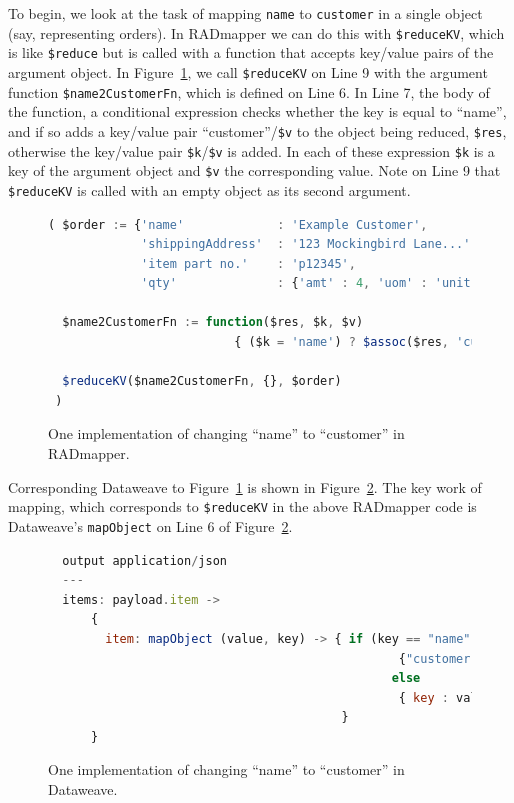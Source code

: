 \documentclass[10pt,letterpaper]{article} %
\newcommand{\stt}[1]{\texttt{#1}} %
\begin{document}
To begin, we look at the task of mapping \stt{name} to \stt{customer} in a single object (say, representing orders).
In RADmapper we can do this with \stt{\$reduceKV}, which is like \stt{\$reduce} but is called with a function that accepts key/value pairs of the argument object.
In Figure~\ref{code:reduceKV}, we call \stt{\$reduceKV} on Line 9 with the argument function \stt{\$name2CustomerFn}, which is defined on Line 6.
In Line 7, the body of the function, a conditional expression checks whether the key is equal to ``name'', and if so adds a key/value pair ``customer''/\stt{\$v} to the object being reduced, \stt{\$res},
otherwise the key/value pair \stt{\$k}/\stt{\$v} is added.
In each of these expression \stt{\$k} is a key of the argument object and \stt{\$v} the corresponding value.
Note on Line 9 that \stt{\$reduceKV} is called with an empty object as its second argument.

\begin{figure}[H]
  \caption{One implementation of changing ``name'' to ``customer'' in RADmapper.}
 \label{code:reduceKV}
\begin{lstlisting}[language=JavaScript,basicstyle=\ttfamily\scriptsize,numberstyle=\scriptsize]
( $order := {'name'             : 'Example Customer',
             'shippingAddress'  : '123 Mockingbird Lane...',
             'item part no.'    : 'p12345',
             'qty'              : {'amt' : 4, 'uom' : 'unit'}};

  $name2CustomerFn := function($res, $k, $v)
                          { ($k = 'name') ? $assoc($res, 'customer', $v) : $assoc($res, $k, $v) };

  $reduceKV($name2CustomerFn, {}, $order)
 )
\end{lstlisting}
\end{figure}  \vspace{-2em}

Corresponding Dataweave to Figure~\ref{code:reduceKV} is shown in Figure~\ref{code:dataweave-1}.
The key work of mapping, which corresponds to \stt{\$reduceKV} in the above RADmapper code is Dataweave's \stt{mapObject} on Line 6 of Figure~\ref{code:dataweave-1}.

 \begin{figure}[H]
  \caption{One implementation of changing ``name'' to ``customer'' in Dataweave.}
 \label{code:dataweave-1}
\begin{lstlisting}[language=JavaScript,basicstyle=\ttfamily\scriptsize,numberstyle=\scriptsize]
  %dw 2.0
  output application/json
  ---
  items: payload.item ->
      {
        item: mapObject (value, key) -> { if (key == "name")
                                                 {"customer" : value }
                                                else
                                                 { key : value}
                                         }
      }
\end{lstlisting}
\end{figure}  \vspace{-2em}
\end{document}
